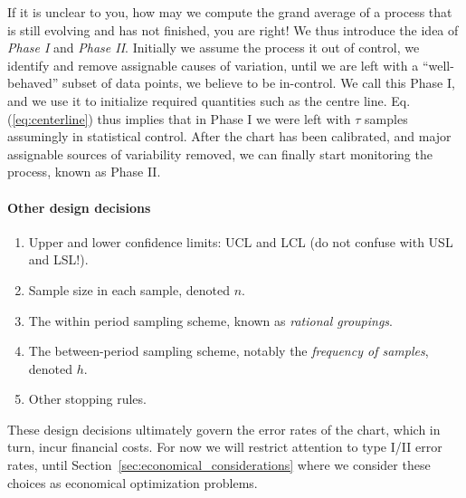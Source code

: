 If it is unclear to you, how may we compute the grand average of a process that is still evolving and has not finished, you are right! We thus introduce the idea of \emph{Phase I} and \emph{Phase II}. 
Initially we assume the process it out of control, we identify and remove assignable causes of variation, until we are left with a ``well-behaved'' subset of data points, we believe to be in-control. We call this Phase I, and we use it to initialize required quantities such as the centre line. 
Eq.(\ref{eq:centerline}) thus implies that in Phase I we were left with $\tau$ samples assumingly in statistical control.
After the chart has been calibrated, and major assignable sources of variability removed, we can finally start monitoring the process, known as Phase II.



\begin{tcolorbox}[breakable]
\paragraph{Other design decisions}
\begin{enumerate}
\item Upper and lower confidence limits: UCL and LCL (do not confuse with USL and LSL!).
\item Sample size in each sample, denoted $n$.
\item The within period sampling scheme, known as \emph{rational groupings}.
\item The between-period sampling scheme, notably the \emph{frequency of samples}, denoted $h$. 
\item Other stopping rules.
\end{enumerate}
\end{tcolorbox}


These design decisions ultimately govern the error rates of the chart, which in turn, incur financial costs. 
For now we will restrict attention to type I/II error rates, until Section~\ref{sec:economical_considerations} where we consider these choices as economical optimization problems.

